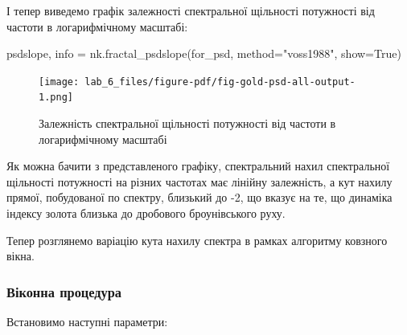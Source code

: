\documentclass[
  letterpaper,
]{report}
\newenvironment{Shaded}{\begin{snugshade}}{\end{snugshade}}
\newcommand{\NormalTok}[1]{\textcolor[rgb]{0.00,0.23,0.31}{#1}}
\newcommand{\OperatorTok}[1]{\textcolor[rgb]{0.37,0.37,0.37}{#1}}
\newcommand{\StringTok}[1]{\textcolor[rgb]{0.13,0.47,0.30}{#1}}
\newcommand{\VariableTok}[1]{\textcolor[rgb]{0.07,0.07,0.07}{#1}}
\begin{document}
І тепер виведемо графік залежності спектральної щільності потужності від
частоти в логарифмічному масштабі:

\begin{Shaded}
\begin{Highlighting}[]
\NormalTok{psdslope, info }\OperatorTok{=}\NormalTok{ nk.fractal\_psdslope(for\_psd,}
\NormalTok{                                     method}\OperatorTok{=}\StringTok{"voss1988"}\NormalTok{,}
\NormalTok{                                     show}\OperatorTok{=}\VariableTok{True}\NormalTok{)}
\end{Highlighting}
\end{Shaded}

\begin{figure}[H]

{\centering \texttt{[image: lab\_6\_files/figure-pdf/fig-gold-psd-all-output-1.png]}

}

\caption{\label{fig-gold-psd-all}Залежність спектральної щільності
потужності від частоти в логарифмічному масштабі}

\end{figure}

Як можна бачити з представленого графіку, спектральний нахил
спектральної щільності потужності на різних частотах має лінійну
залежність, а кут нахилу прямої, побудованої по спектру, близький до -2,
що вказує на те, що динаміка індексу золота близька до дробового
броунівського руху.

Тепер розглянемо варіацію кута нахилу спектра в рамках алгоритму
ковзного вікна.

\hypertarget{ux432ux456ux43aux43eux43dux43dux430-ux43fux440ux43eux446ux435ux434ux443ux440ux430-8}{%
\subsubsection{Віконна
процедура}\label{ux432ux456ux43aux43eux43dux43dux430-ux43fux440ux43eux446ux435ux434ux443ux440ux430-8}}

Встановимо наступні параметри:
\end{document}
